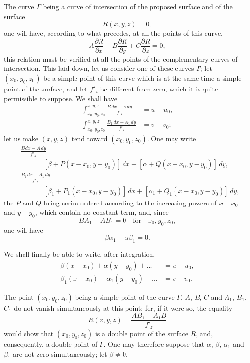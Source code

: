 \documentclass{article}
\begin{document}
The curve $\Gamma$ being a curve of intersection of the proposed surface and of the surface
\[
R(x, y, z) = 0,
\]
one will have, according to what precedes, at all the points of this curve,
\[
A \frac{\partial R}{\partial x} + B \frac{\partial R}{\partial y} + C \frac{\partial R}{\partial z} = 0,
\]
this relation must be verified at all the points of the complementary curves
of intersection. This laid down, let us consider one of these curves $\Gamma$; let $(x_{0}, y_{0}, z_{0})$ be a simple point of this curve which is at the same time a simple point of the surface, and let $f'_{z}$ be different from zero, which it is quite permissible to suppose. We shall have
\[
\begin{aligned}
\int_{x_{0}, y_{0}, z_{0}}^{x, y, z} \frac{B\,dx - A\,dy}{f'_{z}} &= u - u_{0}, \\
\int_{x_{0}, y_{0}, z_{0}}^{x, y, z} \frac{B_{1}\,dx - A_{1}\,dy}{f'_{z}} &= v - v_{0};
\end{aligned}
\]
let us make $(x, y, z)$ tend toward $(x_{0}, y_{0}, z_{0})$. One may write
\[
\begin{aligned}
&\frac{B\,dx - A\,dy}{f'_{z}} \\
&\qquad = [\beta + P(x - x_{0}, y - y_{0})]\,dx + [\alpha + Q(x - x_{0}, y - y_{0})]\,dy, \\
&\frac{B_{1}\,dx - A_{1}\,dy}{f'_{z}} \\
&\qquad = [\beta_{1} + P_{1}(x - x_{0}, y - y_{0})]\,dx + [\alpha_{1} + Q_{1}(x - x_{0}, y - y_{0})]\,dy,
\end{aligned}
\]
the $P$ and $Q$ being series ordered according to the increasing powers of $x - x_{0}$ and $y - y_{0}$, which contain no constant term, and, since
\[
BA_{1} - AB_{1} = 0 \quad \text{for} \quad x_{0}, y_{0}, z_{0},
\]
one will have
\[
\beta\alpha_{1} - \alpha\beta_{1} = 0.
\]

We shall finally be able to write, after integration,
\[
\begin{aligned}
\beta(x - x_{0}) + \alpha(y - y_{0}) + \ldots &= u - u_{0}, \\
\beta_{1}(x - x_{0}) + \alpha_{1}(y - y_{0}) + \ldots &= v - v_{0}.
\end{aligned}
\tag{I}
\]

The point $(x_{0}, y_{0}, z_{0})$ being a simple point of the curve $\Gamma$, $A$, $B$, $C$ and $A_{1}$, $B_{1}$, $C_{1}$ do not vanish simultaneously at this point; for, if it were so, the equality
\[
R(x, y, z) = \frac{AB_{1} - A_{1}B}{f'_{z}}
\]
would show that $(x_{0}, y_{0}, z_{0})$ is a double point of the surface $R$, and, consequently, a double point of $\Gamma$. One may therefore suppose that $\alpha$, $\beta$, $\alpha_{1}$ and $\beta_{1}$ are not zero simultaneously; let $\beta \neq 0$.
\end{document}
